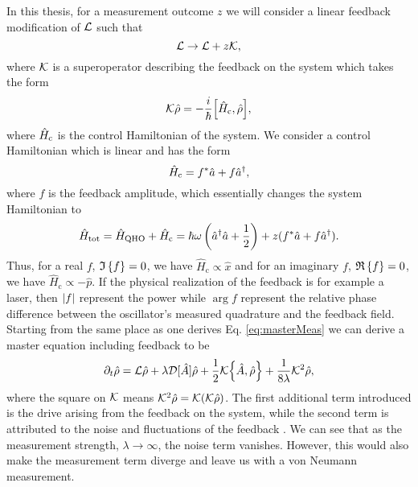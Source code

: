 In this thesis, for a measurement outcome $z$ we will consider a linear feedback modification of $\mathcal{L}$ such that 
\begin{equation}
    \mathcal{L} \to \mathcal{L} + z \mathcal{K},
\end{equation}  
where $\mathcal{K}$ is a superoperator describing the feedback on the system \cite{Annby-Andersson:2024} which takes the form
\begin{equation}
    \feedback\dmatrix = - \frac{i}{\hbar} \comm{\hamiltonian_\mathrm{c}}{\dmatrix},
\end{equation}
where $\hat{H}_\mathrm{c}$ is the control Hamiltonian of the system. We consider a control Hamiltonian which is linear and has the form
\begin{equation}
    \hat{H}_\mathrm{c} = f^* \hat{a} + f \hat{a}^{\dagger},
\end{equation}
where $f$ is the feedback amplitude, which essentially changes the system Hamiltonian to
\begin{equation}
    \hat{H}_\text{tot} = \hat{H}_\text{QHO} + \hat{H}_\text{c} =\hbar\omega\left(\hat{a}^{\dagger}\hat{a} + \frac{1}{2}\right) + z(f^* \hat{a} + f \hat{a}^{\dagger}).
\end{equation}
Thus, for a real $f$, $\mathfrak{I}\left\{f\right\} = 0$, we have $\hat{H}_\text{c} \propto \hat{x}$ and for an imaginary $f$, $\mathfrak{R}\left\{f\right\} = 0$, we have $\hat{H}_\text{c} \propto -\hat{p}$. If the physical realization of the feedback is for example a laser, then $\abs{f}$ represent the power while $\arg{f}$ represent the relative phase difference between the oscillator's measured quadrature and the feedback field. Starting from the same place as one derives Eq. \eqref{eq:masterMeas} we can derive a master equation including feedback \cite{Annby-Andersson:2024} to be
\begin{equation}
    \dt\dmatrix = \liouvillian\dmatrix + \lambda \super{\hat{A}} \dmatrix + \frac{1}{2} \feedback \acomm{\hat{A}}{\dmatrix} + \frac{1}{8\lambda} \feedback^2 \dmatrix, \label{eq:masterFeed}
\end{equation}
where the square on $\mathcal{K}$ means $ \mathcal{K}^2 \hat{\rho} = \mathcal{K} ( \mathcal{K} \hat{\rho})$. The first additional term introduced is the drive arising from the feedback on the system, while the second term is attributed to the noise and fluctuations of the feedback \cite{Annby-Andersson:2024}. We can see that as the measurement strength, $\lambda \to \infty$, the noise term vanishes. However, this would also make the measurement term diverge and leave us with a von Neumann measurement.
